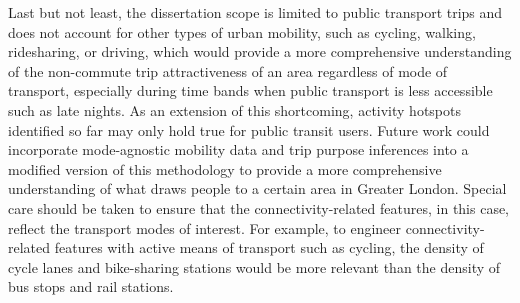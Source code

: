 Last but not least, the dissertation scope is limited to public transport trips and does not account for other types of urban mobility, such as cycling, walking, ridesharing, or driving, which would provide a more comprehensive understanding of the non-commute trip attractiveness of an area regardless of mode of transport, especially during time bands when public transport is less accessible such as late nights. As an extension of this shortcoming, activity hotspots identified so far may only hold true for public transit users. Future work could incorporate mode-agnostic mobility data and trip purpose inferences into a modified version of this methodology to provide a more comprehensive understanding of what draws people to a certain area in Greater London. Special care should be taken to ensure that the connectivity-related features, in this case, reflect the transport modes of interest. For example, to engineer connectivity-related features with active means of transport such as cycling, the density of cycle lanes and bike-sharing stations would be more relevant than the density of bus stops and rail stations.